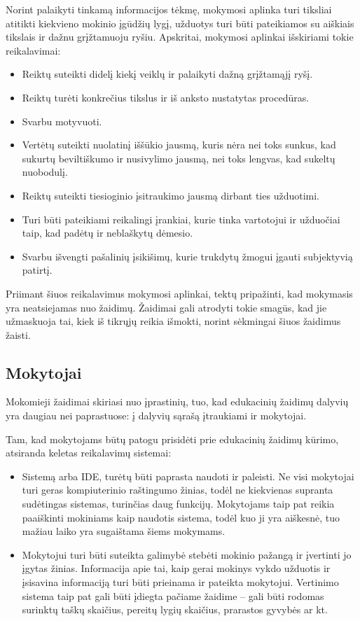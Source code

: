 \documentclass{VUMIFPSkursinis}
\begin{document}
Norint palaikyti tinkamą informacijos tėkmę, mokymosi aplinka turi tiksliai atitikti kiekvieno mokinio įgūdžių lygį, užduotys turi būti pateikiamos su aiškiais tikslais ir dažnu grįžtamuoju ryšiu. Apskritai, mokymosi aplinkai išskiriami tokie reikalavimai:
\begin{itemize}
    \item Reiktų suteikti didelį kiekį veiklų ir palaikyti dažną grįžtamąjį ryšį.
    \item Reiktų turėti konkrečius tikslus ir iš anksto nustatytas procedūras.
    \item Svarbu motyvuoti.
    \item Vertėtų suteikti nuolatinį iššūkio jausmą, kuris nėra nei toks sunkus, kad sukurtų beviltiškumo ir nusivylimo jausmą, nei toks lengvas, kad sukeltų nuobodulį.
    \item Reiktų suteikti tiesioginio įsitraukimo jausmą dirbant ties užduotimi.
    \item Turi būti pateikiami reikalingi įrankiai, kurie tinka vartotojui ir užduočiai taip, kad padėtų ir neblaškytų dėmesio.
    \item Svarbu išvengti pašalinių įsikišimų, kurie trukdytų žmogui įgauti subjektyvią patirtį.
\end{itemize}

Priimant šiuos reikalavimus mokymosi aplinkai, tektų pripažinti, kad mokymasis yra neatsiejamas nuo žaidimų. Žaidimai gali atrodyti tokie smagūs, kad jie užmaskuoja tai, kiek iš tikrųjų reikia išmokti, norint sėkmingai šiuos žaidimus žaisti. \cite{houser1998learning}

\subsection{Mokytojai}
Mokomieji žaidimai skiriasi nuo įprastinių, tuo, kad edukacinių žaidimų dalyvių yra daugiau nei paprastuose: į dalyvių sąrašą įtraukiami ir mokytojai.

Tam, kad mokytojams būtų patogu prisidėti prie edukacinių žaidimų kūrimo, atsiranda keletas reikalavimų sistemai:
\begin{itemize}
    \item Sistemą arba IDE, turėtų būti paprasta naudoti ir paleisti. Ne visi mokytojai turi geras kompiuterinio raštingumo žinias, todėl ne kiekvienas supranta sudėtingas sistemas, turinčias daug funkcijų. Mokytojams taip pat reikia paaiškinti mokiniams kaip naudotis sistema, todėl kuo ji yra aiškesnė, tuo mažiau laiko yra sugaištama šiems mokymams.
    \item Mokytojui turi būti suteikta galimybė stebėti mokinio pažangą ir įvertinti jo įgytas žinias. Informacija apie tai, kaip gerai mokinys vykdo užduotis ir įsisavina informaciją turi būti prieinama ir pateikta mokytojui. Vertinimo sistema taip pat gali būti įdiegta pačiame žaidime -- gali būti rodomas surinktų taškų skaičius, pereitų lygių skaičius, prarastos gyvybės ar kt.
\end{itemize}
\end{document}
